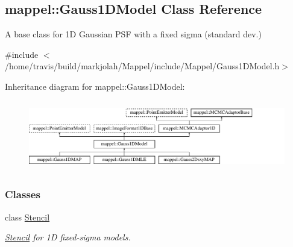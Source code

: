 \hypertarget{classmappel_1_1Gauss1DModel}{}\subsection{mappel\+:\+:Gauss1\+D\+Model Class Reference}
\label{classmappel_1_1Gauss1DModel}


A base class for 1D Gaussian P\+SF with a fixed sigma (standard dev.)  




{\ttfamily \#include $<$/home/travis/build/markjolah/\+Mappel/include/\+Mappel/\+Gauss1\+D\+Model.\+h$>$}

Inheritance diagram for mappel\+:\+:Gauss1\+D\+Model\+:\begin{figure}[H]
\begin{center}
\leavevmode
\includegraphics[height=3.076923cm]{classmappel_1_1Gauss1DModel}
\end{center}
\end{figure}
\subsubsection*{Classes}
\begin{DoxyCompactItemize}
\item 
class \hyperlink{classmappel_1_1Gauss1DModel_1_1Stencil}{Stencil}
\begin{DoxyCompactList}\small\item\em \hyperlink{classmappel_1_1Gauss1DModel_1_1Stencil}{Stencil} for 1D fixed-\/sigma models. \end{DoxyCompactList}\end{DoxyCompactItemize}
